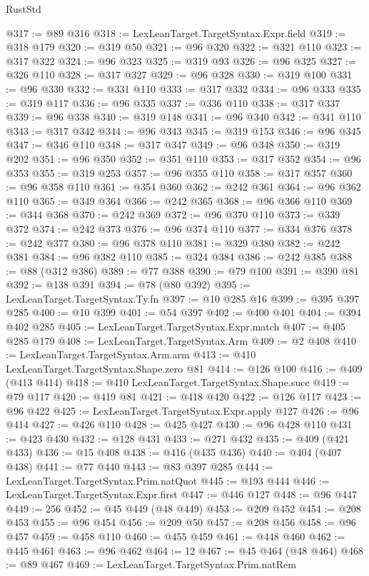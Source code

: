 \begin{lexlean}{RustStd}
\begin{coremodule}
@317 := @89 @316
@318 := LexLeanTarget.TargetSyntax.Expr.field
@319 := @318 @179
@320 := @319 @50
@321 := @96 @320
@322 := @321 @110
@323 := @317 @322
@324 := @96 @323
@325 := @319 @93
@326 := @96 @325
@327 := @326 @110
@328 := @317 @327
@329 := @96 @328
@330 := @319 @100
@331 := @96 @330
@332 := @331 @110
@333 := @317 @332
@334 := @96 @333
@335 := @319 @117
@336 := @96 @335
@337 := @336 @110
@338 := @317 @337
@339 := @96 @338
@340 := @319 @148
@341 := @96 @340
@342 := @341 @110
@343 := @317 @342
@344 := @96 @343
@345 := @319 @153
@346 := @96 @345
@347 := @346 @110
@348 := @317 @347
@349 := @96 @348
@350 := @319 @202
@351 := @96 @350
@352 := @351 @110
@353 := @317 @352
@354 := @96 @353
@355 := @319 @253
@357 := @96 @355 @110
@358 := @317 @357
@360 := @96 @358 @110
@361 := @354 @360
@362 := @242 @361
@364 := @96 @362 @110
@365 := @349 @364
@366 := @242 @365
@368 := @96 @366 @110
@369 := @344 @368
@370 := @242 @369
@372 := @96 @370 @110
@373 := @339 @372
@374 := @242 @373
@376 := @96 @374 @110
@377 := @334 @376
@378 := @242 @377
@380 := @96 @378 @110
@381 := @329 @380
@382 := @242 @381
@384 := @96 @382 @110
@385 := @324 @384
@386 := @242 @385
@388 := @88 (@312 @386)
@389 := @77 @388
@390 := @79 @100
@391 := @390 @81
@392 := @138 @391
@394 := @78 (@80 @392)
@395 := LexLeanTarget.TargetSyntax.Ty.fn
@397 := @10 @285 @16
@399 := @395 @397 @285
@400 := @10 @399
@401 := @54 @397
@402 := @400 @401
@404 := @394 @402 @285
@405 := LexLeanTarget.TargetSyntax.Expr.match
@407 := @405 @285 @179
@408 := LexLeanTarget.TargetSyntax.Arm
@409 := @2 @408
@410 := LexLeanTarget.TargetSyntax.Arm.arm
@413 := @410 LexLeanTarget.TargetSyntax.Shape.zero @81
@414 := @126 @100
@416 := @409 (@413 @414)
@418 := @410 LexLeanTarget.TargetSyntax.Shape.succ
@419 := @79 @117
@420 := @419 @81
@421 := @418 @420
@422 := @126 @117
@423 := @96 @422
@425 := LexLeanTarget.TargetSyntax.Expr.apply @127
@426 := @96 @414
@427 := @426 @110
@428 := @425 @427
@430 := @96 @428 @110
@431 := @423 @430
@432 := @128 @431
@433 := @271 @432
@435 := @409 (@421 @433)
@436 := @15 @408
@438 := @416 (@435 @436)
@440 := @404 (@407 @438)
@441 := @77 @440
@443 := @83 @397 @285
@444 := LexLeanTarget.TargetSyntax.Prim.natQuot
@445 := @193 @444
@446 := LexLeanTarget.TargetSyntax.Expr.first
@447 := @446 @127
@448 := @96 @447
@449 := 256
@452 := @45 @449 (@48 @449)
@453 := @209 @452
@454 := @208 @453
@455 := @96 @454
@456 := @209 @50
@457 := @208 @456
@458 := @96 @457
@459 := @458 @110
@460 := @455 @459
@461 := @448 @460
@462 := @445 @461
@463 := @96 @462
@464 := 12
@467 := @45 @464 (@48 @464)
@468 := @89 @467
@469 := LexLeanTarget.TargetSyntax.Prim.natRem

\end{coremodule}
\end{lexlean}
